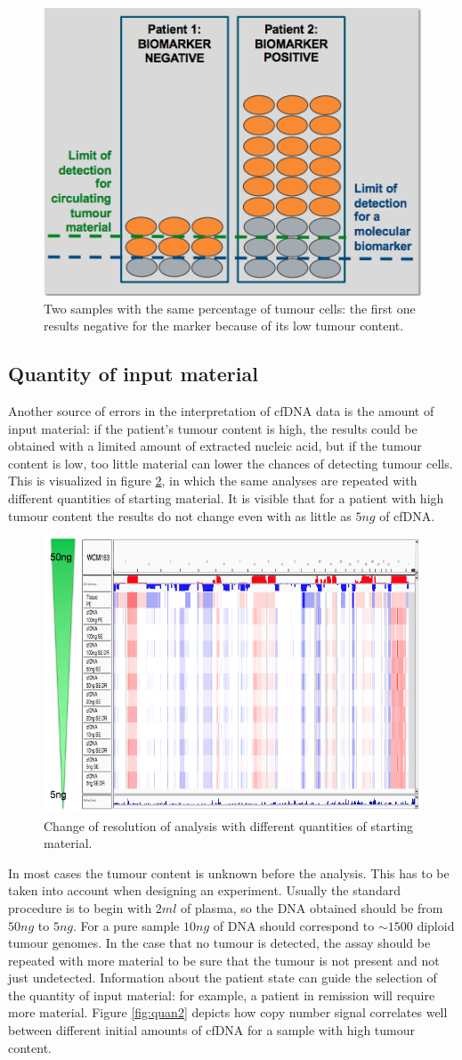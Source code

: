     \begin{figure}[H]
    \centering
        \includegraphics[width=0.4\linewidth]{norm.png}
        \caption{Two samples with the same percentage of tumour cells: the first one results negative for the marker because of its low tumour content.}
        \label{fig:norm}
    \end{figure}

    \subsection{Quantity of input material}
    Another source of errors in the interpretation of cfDNA data is the amount of input material: if the patient's tumour content is high, the results could be obtained with a limited amount of extracted nucleic acid, but if the tumour content is low, too little material can lower the chances of detecting tumour cells.
    This is visualized in figure \ref{fig:quan}, in which the same analyses are repeated with different quantities of starting material.
    It is visible that for a patient with high tumour content the results do not change even with as little as $5ng$ of cfDNA.

    \begin{figure}[H]
        \centering
        \includegraphics[width=0.5\linewidth]{quantity1.png}
        \caption{Change of resolution of analysis with different quantities of starting material.}
        \label{fig:quan}
    \end{figure}

    In most cases the tumour content is unknown before the analysis.
    This has to be taken into account when designing an experiment.
    Usually the standard procedure is to begin with $2ml$ of plasma, so the DNA obtained should be from $50 ng$ to $5ng$.
    For a pure sample $10ng$ of DNA should correspond to $\sim 1500$ diploid tumour genomes.
    In the case that no tumour is detected, the assay should be repeated with more material to be sure that the tumour is not present and not just undetected.
    Information about the patient state can guide the selection of the quantity of input material: for example, a patient in remission will require more material.
    Figure \ref{fig:quan2} depicts how copy number signal correlates well between different initial amounts of cfDNA for a sample with high tumour content.

